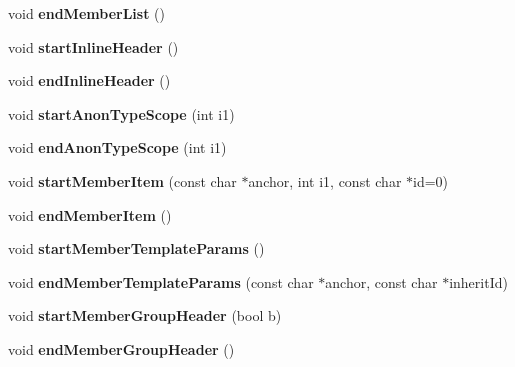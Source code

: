 \begin{DoxyCompactItemize}
\item 
\mbox{\label{class_output_list_a7c8d844390c3ab106b675144baa48fc7}} 
void {\bfseries end\+Member\+List} ()
\item 
\mbox{\label{class_output_list_a8e3c4abdce2bc3800e782a435db5437f}} 
void {\bfseries start\+Inline\+Header} ()
\item 
\mbox{\label{class_output_list_a38e8c68dc35efa5e22e9152f25d8b4eb}} 
void {\bfseries end\+Inline\+Header} ()
\item 
\mbox{\label{class_output_list_a74d52604537a67d666ce88405c23dc49}} 
void {\bfseries start\+Anon\+Type\+Scope} (int i1)
\item 
\mbox{\label{class_output_list_acd5534bf6194d070548a92fae1438f71}} 
void {\bfseries end\+Anon\+Type\+Scope} (int i1)
\item 
\mbox{\label{class_output_list_ae6c475a500a360a62e4d0ec8132445ea}} 
void {\bfseries start\+Member\+Item} (const char $\ast$anchor, int i1, const char $\ast$id=0)
\item 
\mbox{\label{class_output_list_a5a5aff841b0f9609a1d73ed5ad6e0f34}} 
void {\bfseries end\+Member\+Item} ()
\item 
\mbox{\label{class_output_list_af5a6611d3aa4b11eafd0a785d1757483}} 
void {\bfseries start\+Member\+Template\+Params} ()
\item 
\mbox{\label{class_output_list_adbb1f7c76e08d42cf1ecba1ca32440ce}} 
void {\bfseries end\+Member\+Template\+Params} (const char $\ast$anchor, const char $\ast$inherit\+Id)
\item 
\mbox{\label{class_output_list_a04ed9f8df2b249675a1788eee8cd97aa}} 
void {\bfseries start\+Member\+Group\+Header} (bool b)
\item 
\mbox{\label{class_output_list_ac13352584de9c19dd2776d49c1e9bf30}} 
void {\bfseries end\+Member\+Group\+Header} ()
\item 

\end{DoxyCompactItemize}
